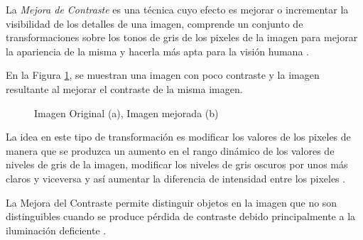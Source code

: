 La \textit{Mejora de Contraste} es una técnica cuyo efecto es mejorar o incrementar la visibilidad de los detalles de una imagen, comprende un conjunto de transformaciones sobre los tonos de gris de los pixeles de la imagen para mejorar la apariencia de la misma y hacerla más apta para la visión humana \cite{kwok2006}.

En la Figura \ref{mejora_contraste}, se muestran una imagen con poco contraste y la imagen resultante al mejorar el contraste de la misma imagen.

\begin{figure}[H]
    \captionsetup[figure]{labelformat=empty}
    \centering
    \caption{Imagen Original (a), Imagen mejorada (b)}
    \label{mejora_contraste}
\end{figure}

La idea en este tipo de transformación es modificar los valores de los pixeles de manera que se produzca un aumento en el rango dinámico de los valores de niveles de gris de la imagen, modificar los niveles de gris oscuros por unos más claros y viceversa y así aumentar la diferencia de intensidad entre los pixeles \cite{kwok2006}.

La Mejora del Contraste permite distinguir objetos en la imagen que no son distinguibles cuando se produce pérdida de contraste debido principalmente a la iluminación deficiente \cite{kwok2006}.

